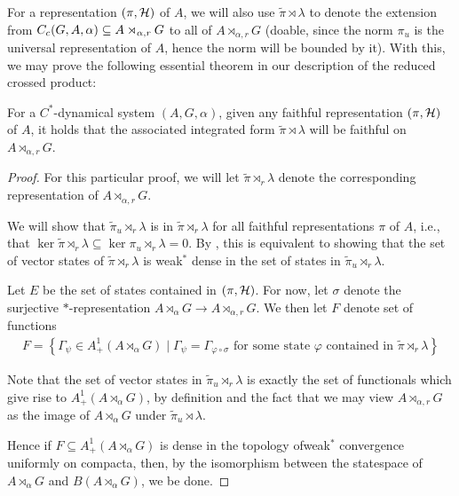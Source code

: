 For a representation $(\pi,\mathcal{H})$ of $A$, we will also use $\tilde \pi \rtimes \lambda$ to denote the extension from $C_c(G,A,\alpha)\subseteq A \rtimes_{\alpha,r}G$ to all of $A \rtimes_{\alpha, r} G$ (doable, since the norm $\pi_u$ is the universal representation of $A$, hence the norm will be bounded by it). With this, we may prove the following essential theorem in our description of the reduced crossed product: 
\begin{theorem}
	For a $C^*$-dynamical system $(A,G,\alpha)$, given any faithful representation $(\pi,\mathcal{H})$ of $A$, it holds that the associated integrated form $\tilde \pi \rtimes \lambda$ will be faithful on $A \rtimes_{\alpha, r} G$.
	\label{mult:reducedfaithful}
\end{theorem}
\begin{proof}
	For this particular proof, we will let $\tilde \pi \rtimes_r \lambda$ denote the corresponding representation of $A \rtimes_{\alpha,r}G$.

	We will show that $\tilde \pi_u \rtimes_r \lambda$ is  in $\tilde \pi \rtimes_r \lambda$ for all faithful representations $\pi$ of $A$, i.e., that $\ker \tilde \pi \rtimes_r \lambda \subseteq \ker \pi_u \rtimes_r \lambda = 0$. By \cite[80]{dixmier1969c}, this is equivalent to showing that the set of vector states of $\tilde \pi \rtimes_r \lambda$ is weak$^*$ dense in the set of states in $\tilde \pi_u \rtimes_r \lambda$.

	Let $E$ be the set of states contained in $(\pi,\mathcal{H})$. For now, let $\sigma$ denote the surjective $*$-representation $A \rtimes_\alpha G \to A \rtimes_{\alpha,r}G$. We then let $F$ denote set of functions
	\begin{align*}
		F = \left\{  \Gamma_\psi \in A_+^1(A\rtimes_\alpha G) \mid \Gamma_\psi = \Gamma_{\varphi \circ \sigma} \text{ for some state } \varphi \text{ contained in } \tilde \pi \rtimes_r \lambda \right\}
	\end{align*}

	Note that the set of vector states in $\tilde \pi_u \rtimes_r \lambda$ is exactly the set of functionals which give rise to $A_+^1(A \rtimes_\alpha G)$, by definition and the fact that we may view $A \rtimes_{\alpha,r} G$ as the image of $A \rtimes_\alpha G$ under $\tilde \pi_u \rtimes \lambda$.

	Hence if $F \subseteq A_+^1(A \rtimes_\alpha G)$ is dense in the topology ofweak$^*$ convergence uniformly on compacta, then, by the isomorphism between the statespace of $A \rtimes_\alpha G$ and $B(A \rtimes_\alpha G)$, we be done.


\end{proof}
